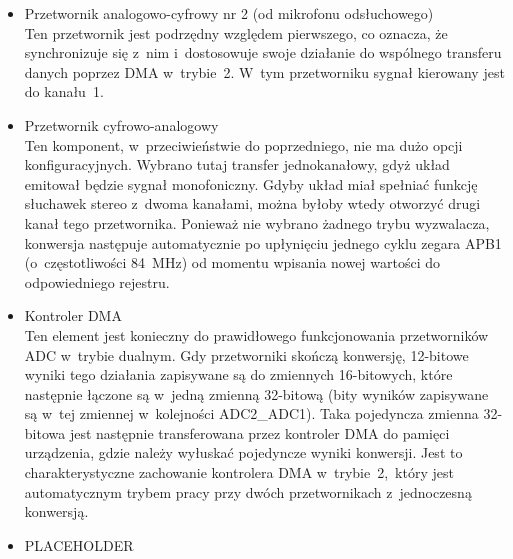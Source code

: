 \begin{itemize}
\begin{center}
\end{center}
	W~związku z~tym, przetwornik w~takiej konfiguracji będzie mógł efektywnie konwertować sygnały o~maksymalnej częstotliwości równej \SI{3811}{\Hz}. Należy jednak wziąć pod uwagę czas, jaki zajmą obliczenia generujące sygnał przeciwstawny, częstotliwość wzbudzeń pochodzących od timera oraz czas konwersji DAC. Wszystkie te oraz inne czynniki składają się na zmniejszenie efektywnej zdolności przetwarzania układu. Autor po opisaniu wszystkich parametrów konfiguracyjnych oraz zaimplementowaniu i~przetestowaniu programu przedstawi maksymalną częstotliwość, jaką układ jest w~stanie przetwarzać.
	\item Przetwornik analogowo-cyfrowy nr 2 (od mikrofonu odsłuchowego)\\
	Ten przetwornik jest podrzędny względem pierwszego, co oznacza, że synchronizuje się z~nim i~dostosowuje swoje działanie do wspólnego transferu danych poprzez DMA w~trybie~2. W~tym przetworniku sygnał kierowany jest do kanału~1.
	\item Przetwornik cyfrowo-analogowy\\
	Ten komponent, w~przeciwieństwie do poprzedniego, nie ma dużo opcji konfiguracyjnych. Wybrano tutaj transfer jednokanałowy, gdyż układ emitował będzie sygnał monofoniczny. Gdyby układ miał spełniać funkcję słuchawek stereo z~dwoma kanałami, można byłoby wtedy otworzyć drugi kanał tego przetwornika. Ponieważ nie wybrano żadnego trybu wyzwalacza, konwersja następuje automatycznie po upłynięciu jednego cyklu zegara APB1 (o~częstotliwości \SI{84}{\MHz}) od momentu wpisania nowej wartości do odpowiedniego rejestru.
	\item Kontroler DMA\\
	Ten element jest konieczny do prawidłowego funkcjonowania przetworników ADC w~trybie dualnym. Gdy przetworniki skończą konwersję, 12-bitowe wyniki tego działania zapisywane są do zmiennych 16-bitowych, które następnie łączone są w~jedną zmienną 32-bitową (bity wyników zapisywane są w~tej zmiennej w~kolejności ADC2\_ADC1). Taka pojedyncza zmienna 32-bitowa jest następnie transferowana przez kontroler DMA do pamięci urządzenia, gdzie należy wyłuskać pojedyncze wyniki konwersji. Jest to charakterystyczne zachowanie kontrolera DMA w~trybie~2,~który jest automatycznym trybem pracy przy dwóch przetwornikach z~jednoczesną konwersją.
	\item PLACEHOLDER
\end{itemize}
